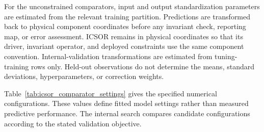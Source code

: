 For the unconstrained comparators, input and output standardization parameters are estimated from the relevant training partition. Predictions are transformed back to physical component coordinates before any invariant check, reporting map, or error assessment. ICSOR remains in physical coordinates so that its driver, invariant operator, and deployed constraints use the same component convention. Internal-validation transformations are estimated from tuning-training rows only. Held-out observations do not determine the means, standard deviations, hyperparameters, or correction weights.

Table~\ref{tab:icsor_comparator_settings} gives the specified numerical configurations. These values define fitted model settings rather than measured predictive performance. The internal search compares candidate configurations according to the stated validation objective.


